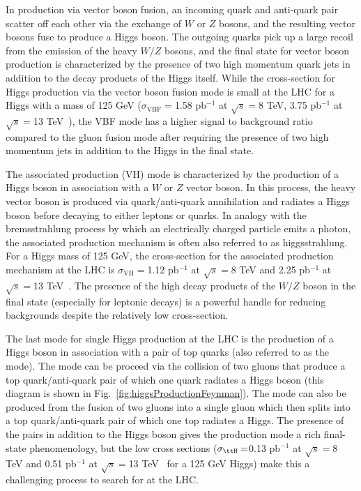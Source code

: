 In production via vector boson fusion, an incoming quark and anti-quark pair scatter off each other via the exchange of $W$ or $Z$ bosons, and the resulting vector bosons fuse to produce a Higgs boson. The outgoing quarks pick up a large recoil from the emission of the heavy $W/Z$ bosons, and the final state for vector boson production is characterized by the presence of two high momentum quark jets in addition to the decay products of the Higgs itself. While the cross-section for Higgs production via the vector boson fusion mode is small at the LHC for a Higgs with a mass of 125 GeV ($\sigma_{\text{VBF}} = $1.58 pb$^{-1}$ at $\sqrt{s} = $8 TeV, 3.75 pb$^{-1}$ at $\sqrt{s} = $13 TeV~\cite{Heinemeyer:2013tqa}), the VBF mode has a higher signal to background ratio compared to the gluon fusion mode after requiring the presence of two high momentum jets in addition to the Higgs in the final state.

The associated production (VH) mode is characterized by the production of a Higgs boson in association with a $W$ or $Z$ vector boson. In this process, the heavy vector boson is produced via quark/anti-quark annihilation and radiates a Higgs boson before decaying to either leptons or quarks. In analogy with the bremsstrahlung process by which an electrically charged particle emits a photon, the associated production mechanism is often also referred to as higgsstrahlung. For a Higgs mass of 125 GeV, the cross-section for the associated production mechanism at the LHC is $\sigma_{\text{VH}} = $1.12 pb$^{-1}$ at $\sqrt{s} = $8 TeV and 2.25 pb$^{-1}$ at $\sqrt{s} = $13 TeV~\cite{Heinemeyer:2013tqa}. The presence of the high \pt decay products of the $W/Z$ boson in the final state (especially for leptonic decays) is a powerful handle for reducing backgrounds despite the relatively low cross-section.

The last mode for single Higgs production at the LHC is the production of a Higgs boson in association with a pair of top quarks (also referred to as the \ttH mode). The \ttH mode can be proceed via the collision of two gluons that produce a top quark/anti-quark pair of which one quark radiates a Higgs boson (this diagram is shown in Fig.~\ref{fig:higgsProductionFeynman}). The \ttH mode can also be produced from the fusion of two gluons into a single gluon which then splits into a top quark/anti-quark pair of which one top radiates a Higgs. The presence of the \ttbar pairs in addition to the Higgs boson gives the \ttH production mode a rich final-state phenomenology, but the low cross sections ($\sigma_{\ttH} = $0.13 pb$^{-1}$ at $\sqrt{s} = $8 TeV and 0.51 pb$^{-1}$ at $\sqrt{s} = $13 TeV~\cite{Heinemeyer:2013tqa} for a 125 GeV Higgs) make this a challenging process to search for at the LHC.

